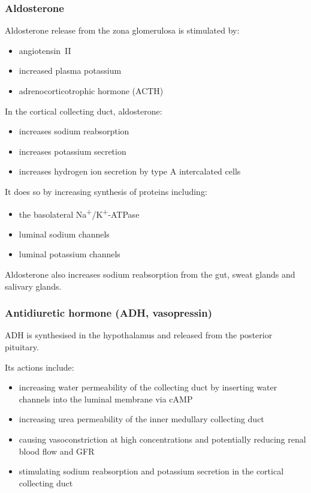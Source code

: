 \documentclass[11pt,a4paper]{article}
\begin{document}
\subsubsection{Aldosterone}

Aldosterone release from the zona glomerulosa is stimulated by:
\begin{itemize}
    \item angiotensin~II
    \item increased plasma potassium
    \item adrenocorticotrophic hormone (ACTH)
\end{itemize}

In the cortical collecting duct, aldosterone:
\begin{itemize}
    \item increases sodium reabsorption
    \item increases potassium secretion
    \item increases hydrogen ion secretion by type A intercalated cells
\end{itemize}

It does so by increasing synthesis of proteins including:
\begin{itemize}
    \item the basolateral Na\textsuperscript{+}/K\textsuperscript{+}-ATPase
    \item luminal sodium channels
    \item luminal potassium channels
\end{itemize}

Aldosterone also increases sodium reabsorption from the gut, sweat glands and salivary glands.

\subsubsection{Antidiuretic hormone (ADH, vasopressin)}

ADH is synthesised in the hypothalamus and released from the posterior pituitary.

Its actions include:
\begin{itemize}
    \item increasing water permeability of the collecting duct by inserting water channels into the luminal membrane via cAMP
    \item increasing urea permeability of the inner medullary collecting duct
    \item causing vasoconstriction at high concentrations and potentially reducing renal blood flow and GFR
    \item stimulating sodium reabsorption and potassium secretion in the cortical collecting duct
\end{itemize}
\end{document}
